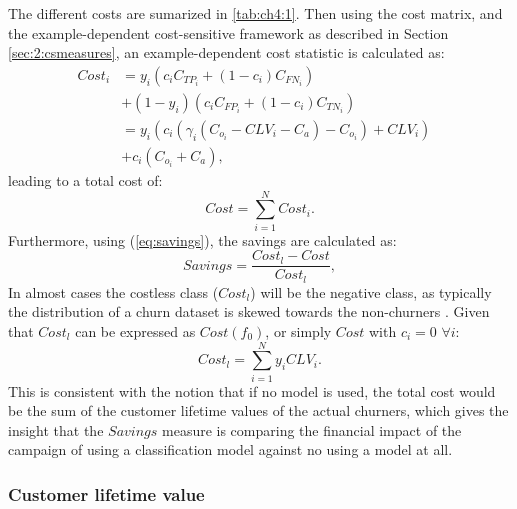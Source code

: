 The different costs are sumarized in \tablename{ \ref{tab:ch4:1}}.	Then using the cost 
matrix, and the example-dependent cost-sensitive framework as described in Section 
\ref{sec:2:csmeasures}, an example-dependent cost statistic is calculated as:
\begin{align}
  Cost_i &= y_i(c_i C_{TP_i} + (1-c_i)C_{FN_i})& \nonumber \\
         &  + (1-y_i)(c_i C_{FP_i} + (1-c_i)C_{TN_i})& \nonumber \\
         &= y_i(c_i\left(\gamma_i(C_{o_i}-CLV_i-C_a)-C_{o_i}\right)+CLV_i)&\nonumber \\
         & +c_i(C_{o_i}+C_a),&
	\end{align}
leading to a total cost of:
\begin{equation}
    Cost = \sum_{i=1}^N Cost_i.
\end{equation}
Furthermore, using (\ref{eq:savings}), the savings are calculated as:
\begin{equation}
  Savings = \frac{Cost_l - Cost}{Cost_l},
\end{equation} 
In almost cases the costless class ($Cost_l$) will be the negative class, as typically the 
distribution of a churn dataset is skewed towards the non-churners \citep{Verbeke2012}. Given that 
$Cost_l$ can be expressed as $Cost(f_0)$, or simply $Cost$ with $c_i=0$ $\forall i$:
\begin{equation}
 Cost_l = \sum_{i=1}^{N} y_i CLV_i.
\end{equation}
This is consistent with the notion that if no model is used, the total cost would be the 
sum of the customer lifetime values of the actual churners, which gives the insight 
that the $Savings$ measure is comparing the financial impact of the campaign of using a 
classification model against no using a model at all.


\subsubsection{Customer lifetime value}

